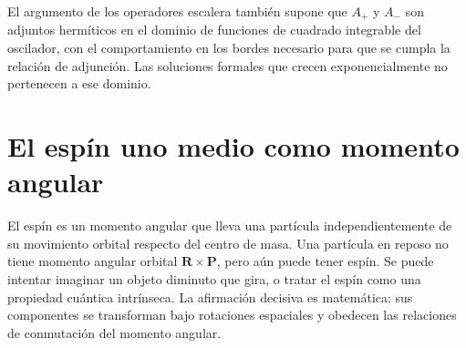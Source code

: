 \begin{classroomqa}
\end{classroomqa}

El argumento de los operadores escalera también supone que \(A_{+}\) y \(A_{-}\) son adjuntos hermíticos en el dominio de funciones de cuadrado integrable del oscilador, con el comportamiento en los bordes necesario para que se cumpla la relación de adjunción. Las soluciones formales que crecen exponencialmente no pertenecen a ese dominio.

\begin{classroomqa}
\end{classroomqa}

\section{El espín uno medio como momento angular}

El espín es un momento angular que lleva una partícula independientemente de su movimiento orbital respecto del centro de masa. Una partícula en reposo no tiene momento angular orbital \(\mathbf R\times\mathbf P\), pero aún puede tener espín. Se puede intentar imaginar un objeto diminuto que gira, o tratar el espín como una propiedad cuántica intrínseca. La afirmación decisiva es matemática: sus componentes se transforman bajo rotaciones espaciales y obedecen las relaciones de conmutación del momento angular.

